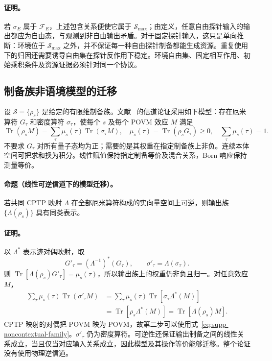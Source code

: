 \documentclass[UTF8,11pt,a4paper,fontset=none]{ctexart}
\newcommand{\Tr}{\operatorname{Tr}}
\begin{document}
\paragraph{证明。}
若 $\sigma_E$ 属于 $\mathcal F_E$，上述包含关系便使它属于 $\mathcal S_{\max}$；由定义，任意自由探针输入的输出都应为自由态，与观测到非自由输出矛盾。对于固定探针输入，这只是单向推断：环境位于 $\mathcal S_{\max}$ 之外，并不保证每一种自由探针制备都能生成资源。重复使用下的归因还需要诱导自由集在探针反作用下稳定。环境自由集、固定相互作用、初始乘积条件及资源证据必须针对同一个协议。



\subsection{制备族非语境模型的迁移}
设 $\mathcal S=\{\rho_s\}$ 是给定的有限维制备族。文献~\cite{CamposDelgadoIpek2026} 的信道论证采用如下模型：存在厄米算符 $G_\tau$ 和密度算符 $\sigma_\tau$，使每个 $s$ 及每个 POVM 效应 $M$ 满足
\begin{equation}
\Tr(\rho_s M)=\sum_\tau\mu_s(\tau)\Tr(\sigma_\tau M),
\quad \mu_s(\tau)=\Tr(\rho_sG_\tau)\geq0,
\quad\sum_\tau\mu_s(\tau)=1.
\label{eq:supp-noncontextual-family}
\end{equation}
不要求 $G_\tau$ 对所有量子态均为正；需要的是其权重在指定制备族上非负。连续本体空间可把求和换为积分。线性赋值保持指定制备等价及混合关系，Born 响应保持测量等价。

\paragraph{命题（线性可逆信道下的模型迁移）。}
若共同 CPTP 映射 $\Lambda$ 在全部厄米算符构成的实向量空间上可逆，则输出族 $\{\Lambda(\rho_s)\}$ 具有同类表示。

\paragraph{证明。}
以 $\Lambda^*$ 表示迹对偶映射，取
\begin{equation}
G'_\tau=(\Lambda^{-1})^*(G_\tau),\qquad
\sigma'_\tau=\Lambda(\sigma_\tau).
\end{equation}
则 $\Tr[\Lambda(\rho_s)G'_\tau]=\mu_s(\tau)$，所以输出族上的权重仍非负且归一。对任意效应 $M$，
\begin{align}
\sum_\tau\mu_s(\tau)\Tr(\sigma'_\tau M)
&=\sum_\tau\mu_s(\tau)\Tr[\sigma_\tau\Lambda^*(M)]\nonumber\\
&=\Tr[\rho_s\Lambda^*(M)]
=\Tr[\Lambda(\rho_s)M].
\end{align}
CPTP 映射的对偶把 POVM 映为 POVM，故第二步可以使用式~\eqref{eq:supp-noncontextual-family}。$\sigma'_\tau$ 仍为密度算符。可逆性还保证输出制备之间的线性关系成立，当且仅当对应输入关系成立，因此模型及其操作等价能够迁移。整个论证没有使用物理逆信道。
\end{document}
